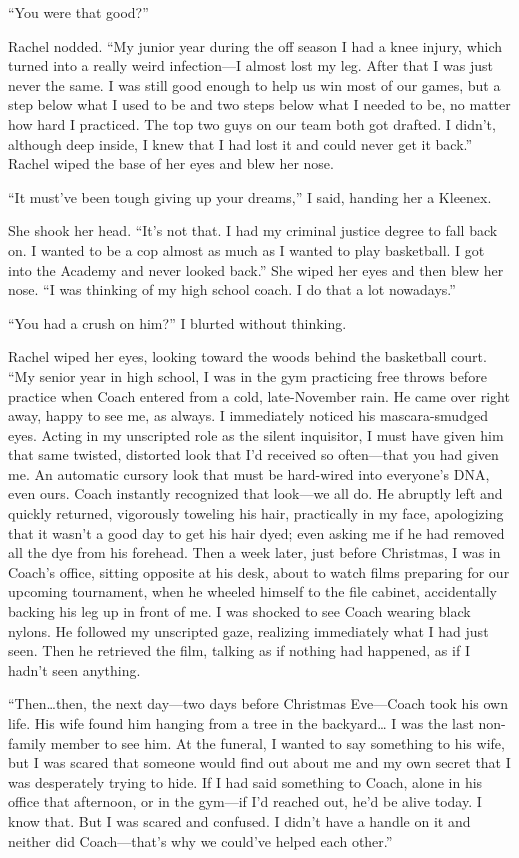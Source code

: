 ``You were that good?''

Rachel nodded. ``My junior year during the off season I had a knee
injury, which turned into a really weird infection---I almost lost my
leg. After that I was just never the same. I was still good enough to
help us win most of our games, but a step below what I used to be and
two steps below what I needed to be, no matter how hard I practiced. The
top two guys on our team both got drafted. I didn't, although deep
inside, I knew that I had lost it and could never get it back.'' Rachel
wiped the base of her eyes and blew her nose.

``It must've been tough giving up your dreams,'' I said, handing her a
Kleenex.

She shook her head. ``It's not that. I had my criminal justice degree to
fall back on. I wanted to be a cop almost as much as I wanted to play
basketball. I got into the Academy and never looked back.'' She wiped
her eyes and then blew her nose. ``I was thinking of my high school
coach. I do that a lot nowadays.''

``You had a crush on him?'' I blurted without thinking.

Rachel wiped her eyes, looking toward the woods behind the basketball
court. ``My senior year in high school, I was in the gym practicing free
throws before practice when Coach entered from a cold, late-November
rain. He came over right away, happy to see me, as always. I immediately
noticed his mascara-smudged eyes. Acting in my unscripted role as the
silent inquisitor, I must have given him that same twisted, distorted
look that I'd received so often---that you had given me. An automatic
cursory look that must be hard-wired into everyone's DNA, even ours.
Coach instantly recognized that look---we all do. He abruptly left and
quickly returned, vigorously toweling his hair, practically in my face,
apologizing that it wasn't a good day to get his hair dyed; even asking
me if he had removed all the dye from his forehead. Then a week later,
just before Christmas, I was in Coach's office, sitting opposite at his
desk, about to watch films preparing for our upcoming tournament, when
he wheeled himself to the file cabinet, accidentally backing his leg up
in front of me. I was shocked to see Coach wearing black nylons. He
followed my unscripted gaze, realizing immediately what I had just seen.
Then he retrieved the film, talking as if nothing had happened, as if I
hadn't seen anything.

``Then\ldots then, the next day---two days before Christmas Eve---Coach
took his own life. His wife found him hanging from a tree in the
backyard\ldots{} I was the last non-family member to see him. At the
funeral, I wanted to say something to his wife, but I was scared that
someone would find out about me and my own secret that I was desperately
trying to hide. If I had said something to Coach, alone in his office
that afternoon, or in the gym---if I'd reached out, he'd be alive today.
I know that. But I was scared and confused. I didn't have a handle on it
and neither did Coach---that's why we could've helped each other.''

